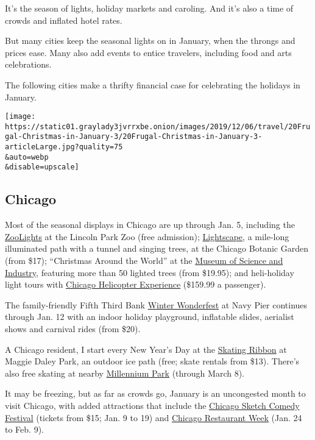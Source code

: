 It's the season of lights, holiday markets and caroling. And it's also a
time of crowds and inflated hotel rates.

But many cities keep the seasonal lights on in January, when the throngs
and prices ease. Many also add events to entice travelers, including
food and arts celebrations.

The following cities make a thrifty financial case for celebrating the
holidays in January.

\texttt{[image: https://static01.graylady3jvrrxbe.onion/images/2019/12/06/travel/20Frugal-Christmas-in-January-3/20Frugal-Christmas-in-January-3-articleLarge.jpg?quality=75\\\&auto=webp\\\&disable=upscale]}

\hypertarget{chicago}{%
\subsection{Chicago}\label{chicago}}

Most of the seasonal displays in Chicago are up through Jan. 5,
including the
\href{https://www.lpzoo.org/zoolights-presented-comed-and-invesco-qqq}{ZooLights}
at the Lincoln Park Zoo (free admission);
\href{https://www.chicagobotanic.org/lightscape}{Lightscape}, a
mile-long illuminated path with a tunnel and singing trees, at the
Chicago Botanic Garden (from \$17); ``Christmas Around the World'' at
the
\href{https://www.msichicago.org/explore/whats-here/exhibits/christmas-around-the-world/}{Museum
of Science and Industry}, featuring more than 50 lighted trees (from
\$19.95); and heli-holiday light tours with
\href{https://www.chicagohelicopterexperience.com/product/holiday-lights-experience/}{Chicago
Helicopter Experience} (\$159.99 a passenger).

The family-friendly Fifth Third Bank
\href{https://navypier.org/event/fifth-third-bank-winter-wonderfest-2019/}{Winter
Wonderfest} at Navy Pier continues through Jan. 12 with an indoor
holiday playground, inflatable slides, aerialist shows and carnival
rides (from \$20).

A Chicago resident, I start every New Year's Day at the
\href{https://maggiedaleypark.com/things-to-do-see/skating-ribbon/}{Skating
Ribbon} at Maggie Daley Park, an outdoor ice path (free; skate rentals
from \$13). There's also free skating at nearby
\href{https://www.chicago.gov/city/en/depts/dca/supp_info/millennium_park10.html}{Millennium
Park} (through March 8).

It may be freezing, but as far as crowds go, January is an uncongested
month to visit Chicago, with added attractions that include the
\href{https://www.stage773.com/cscf-lineup-2020}{Chicago Sketch Comedy
Festival} (tickets from \$15; Jan. 9 to 19) and
\href{https://www.choosechicago.com/chicago-restaurant-week/}{Chicago
Restaurant Week} (Jan. 24 to Feb. 9).

